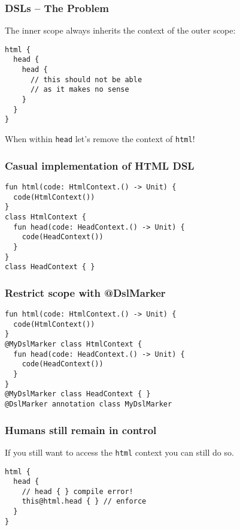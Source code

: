 
\begin{frame}[fragile] \frametitle{DSLs -- The Problem}
The inner scope always inherits the context of the outer scope:
\begin{lstlisting}
html {
  head {
    head {
      // this should not be able
      // as it makes no sense
    }
  }
}
\end{lstlisting}
When within \texttt{head} let's remove the context of \texttt{html}!
\end{frame}


\begin{frame}[fragile] \frametitle{Casual implementation of HTML DSL}
\begin{lstlisting}
fun html(code: HtmlContext.() -> Unit) {
  code(HtmlContext())
}
class HtmlContext {
  fun head(code: HeadContext.() -> Unit) {
    code(HeadContext())
  }
}
class HeadContext { }
\end{lstlisting}
\end{frame}


\begin{frame}[fragile] \frametitle{Restrict scope with @DslMarker}
\begin{lstlisting}
fun html(code: HtmlContext.() -> Unit) {
  code(HtmlContext())
}
@MyDslMarker class HtmlContext {
  fun head(code: HeadContext.() -> Unit) {
    code(HeadContext())
  }
}
@MyDslMarker class HeadContext { }
@DslMarker annotation class MyDslMarker
\end{lstlisting}
\end{frame}

\begin{frame}[fragile] \frametitle{Humans still remain in control}
If you still want to access the \texttt{html} context you can still do so.
\begin{lstlisting}
html {
  head {
    // head { } compile error!
    this@html.head { } // enforce
  }
}
\end{lstlisting}
\end{frame}

